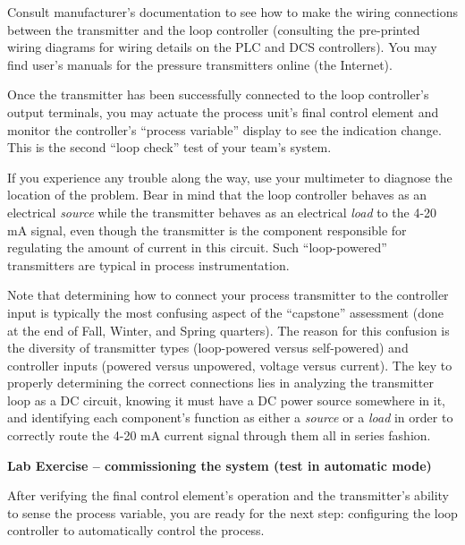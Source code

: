Consult manufacturer's documentation to see how to make the wiring connections between the transmitter and the loop controller (consulting the pre-printed wiring diagrams for wiring details on the PLC and DCS controllers).  You may find user's manuals for the pressure transmitters online (the Internet).

\vskip 10pt

Once the transmitter has been successfully connected to the loop controller's output terminals, you may actuate the process unit's final control element and monitor the controller's ``process variable'' display to see the indication change.  This is the second ``loop check'' test of your team's system.

\vskip 10pt

If you experience any trouble along the way, use your multimeter to diagnose the location of the problem.  Bear in mind that the loop controller behaves as an electrical {\it source} while the transmitter behaves as an electrical {\it load} to the 4-20 mA signal, even though the transmitter is the component responsible for regulating the amount of current in this circuit.  Such ``loop-powered'' transmitters are typical in process instrumentation.

\vskip 10pt

Note that determining how to connect your process transmitter to the controller input is typically the most confusing aspect of the ``capstone'' assessment (done at the end of Fall, Winter, and Spring quarters).  The reason for this confusion is the diversity of transmitter types (loop-powered versus self-powered) and controller inputs (powered versus unpowered, voltage versus current).  The key to properly determining the correct connections lies in analyzing the transmitter loop as a DC circuit, knowing it must have a DC power source somewhere in it, and identifying each component's function as either a {\it source} or a {\it load} in order to correctly route the 4-20 mA current signal through them all in series fashion.








\vfil \eject

\noindent
{\bf Lab Exercise -- commissioning the system (test in automatic mode)}

\vskip 5pt

After verifying the final control element's operation and the transmitter's ability to sense the process variable, you are ready for the next step: configuring the loop controller to automatically control the process.  

